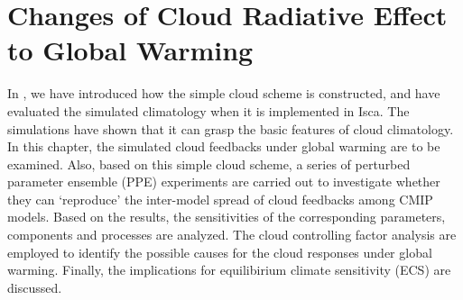 \chapter{Changes of Cloud Radiative Effect to Global Warming}
\label{ch:cld_fbk}

In , we have introduced how the simple cloud scheme is constructed, and have evaluated the simulated climatology when it is implemented in Isca. The simulations have shown that it can grasp the basic features of cloud climatology. In this chapter, the simulated cloud feedbacks under global warming are to be examined. Also, based on this simple cloud scheme, a series of perturbed parameter ensemble (PPE) experiments are carried out to investigate whether they can `reproduce' the inter-model spread of cloud feedbacks among CMIP models. Based on the results, the sensitivities of the corresponding parameters, components and processes are analyzed. The cloud controlling factor analysis are employed to identify the possible causes for the cloud responses under global warming. Finally, the implications for equilibirium climate sensitivity (ECS) are discussed.

